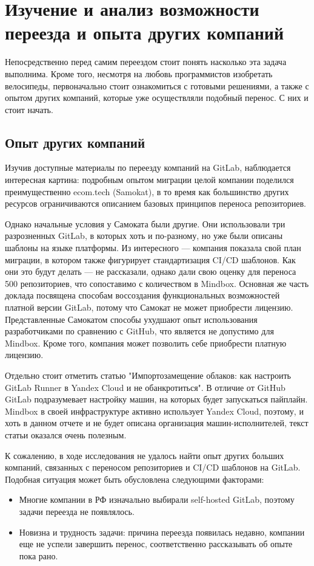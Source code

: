 \chapter{Изучение и анализ возможности переезда и опыта других компаний} \label{ch:ch1}
Непосредственно перед самим переездом стоит понять насколько эта задача выполнима.
Кроме того, несмотря на любовь программистов изобретать велосипеды,
первоначально стоит ознакомиться с готовыми решениями, а также с опытом других компаний,
которые уже осуществляли подобный перенос.
С них и стоит начать.


\section{Опыт других компаний}\label{sec:other-companies-expirience}
Изучив доступные материалы по переезду компаний на GitLab,
наблюдается интересная картина: подробным опытом миграции целой компании поделился преимущественно ecom.tech (Samokat),
в то время как большинство других ресурсов ограничиваются описанием базовых принципов переноса репозиториев.

Однако начальные условия у Самоката были другие.
Они использовали три разрозненных GitLab, в которых хоть и по-разному, но уже были описаны шаблоны на языке платформы.
Из интересного — компания показала свой план миграции, в котором также фигурирует стандартизация CI/CD шаблонов.
Как они это будут делать — не рассказали, однако дали свою оценку для переноса 500 репозиториев, что сопоставимо с количеством в Mindbox.
Основная же часть доклада посвящена способам воссоздания функциональных возможностей платной версии GitLab, потому что
Самокат не может приобрести лицензию.
Представленные Самокатом способы ухудшают опыт использования разработчиками по сравнению с GitHub,
что является не допустимо для Mindbox.
Кроме того, компания может позволить себе приобрести платную лицензию.

Отдельно стоит отметить статью "Импортозамещение облаков: как настроить GitLab Runner в Yandex Cloud и не обанкротиться".
В отличие от GitHub GitLab подразумевает настройку машин, на которых будет запускаться пайплайн.
Mindbox в своей инфраструктуре активно использует Yandex Cloud, поэтому, и хоть в данном отчете и не будет описана организация машин-исполнителей,
текст статьи оказался очень полезным.

К сожалению, в ходе исследования не удалось найти опыт других больших компаний, связанных с переносом репозиториев
и CI/CD шаблонов на GitLab.
Подобная ситуация может быть обусловлена следующими факторами:
\begin{itemize}
  \item Многие компании в РФ изначально выбирали self-hosted GitLab, поэтому задачи переезда не появлялось.
  \item Новизна и трудность задачи: причина переезда появилась недавно, компании еще не успели завершить перенос, соответственно рассказывать об опыте пока рано.
\end{itemize}

